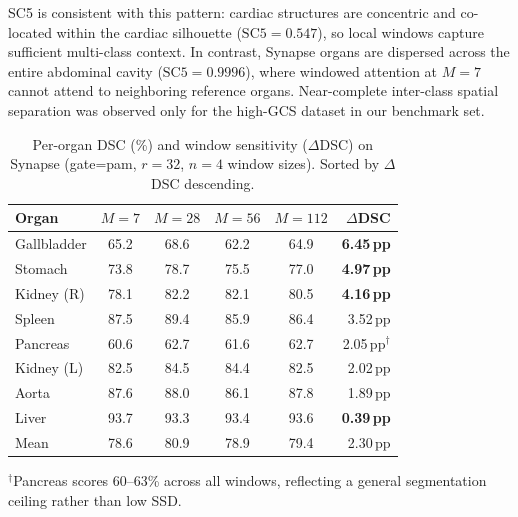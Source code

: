 SC5 is consistent with this pattern: cardiac structures are concentric and co-located within the cardiac silhouette ($\text{SC5} = 0.547$), so local windows capture sufficient multi-class context. In contrast, Synapse organs are dispersed across the entire abdominal cavity ($\text{SC5} = 0.9996$), where windowed attention at $M{=}7$ cannot attend to neighboring reference organs. Near-complete inter-class spatial separation was observed only for the high-GCS dataset in our benchmark set.

\begin{table}[tb]
  \caption{Per-organ DSC (\%) and window sensitivity ($\Delta$DSC) on Synapse (gate=pam, $r{=}32$, $n{=}4$ window sizes). Sorted by $\Delta$DSC descending.}
  \label{tab:per_organ}
  \centering
  \setlength{\tabcolsep}{3.5pt}
  \small
  \begin{tabular}{lccccr}
    \toprule
    Organ & $M{=}7$ & $M{=}28$ & $M{=}56$ & $M{=}112$ & $\Delta$DSC \\
    \midrule
    Gallbladder & 65.2 & 68.6 & 62.2 & 64.9 & \textbf{6.45\,pp} \\
    Stomach     & 73.8 & 78.7 & 75.5 & 77.0 & \textbf{4.97\,pp} \\
    Kidney (R)  & 78.1 & 82.2 & 82.1 & 80.5 & \textbf{4.16\,pp} \\
    Spleen      & 87.5 & 89.4 & 85.9 & 86.4 & 3.52\,pp \\
    Pancreas    & 60.6 & 62.7 & 61.6 & 62.7 & 2.05\,pp$^\dagger$ \\
    Kidney (L)  & 82.5 & 84.5 & 84.4 & 82.5 & 2.02\,pp \\
    Aorta       & 87.6 & 88.0 & 86.1 & 87.8 & 1.89\,pp \\
    Liver       & 93.7 & 93.3 & 93.4 & 93.6 & \textbf{0.39\,pp} \\
    \midrule
    Mean        & 78.6 & 80.9 & 78.9 & 79.4 & 2.30\,pp \\
    \bottomrule
  \end{tabular}
  \par\vspace{5pt}
  \parbox{\columnwidth}{\footnotesize $^\dagger$Pancreas scores 60--63\% across all windows, reflecting a general segmentation ceiling rather than low SSD.}
\end{table}

